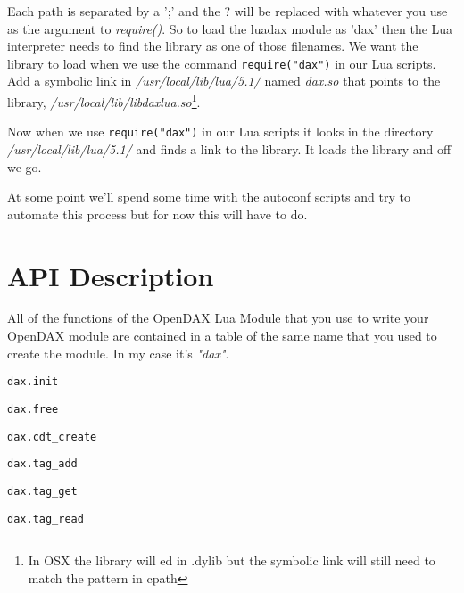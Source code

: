 Each path is separated by a ';' and the ? will be replaced with whatever you use as the argument to \textit{require()}.  So to load the luadax module as 'dax' then the Lua interpreter needs to find the library as one of those filenames.  We want the library to load when we use the command \verb|require("dax")| in our Lua scripts.  Add a symbolic link in \textit{/usr/local/lib/lua/5.1/} named \textit{dax.so} that points to the library, \textit{/usr/local/lib/libdaxlua.so}\footnote{In OSX the library will ed in .dylib but the symbolic link will still need to match the pattern in cpath}.

Now when we use \verb|require("dax")| in our Lua scripts it looks in the directory \textit{/usr/local/lib/lua/5.1/} and finds a link to the library.  It loads the library and off we go.

At some point we'll spend some time with the autoconf scripts and try to automate this process but for now this will have to do.

\section{API Description}

All of the functions of the OpenDAX Lua Module that you use to write your OpenDAX module are contained in a table of the same name that you used to create the module.  In my case it's \textit{"dax"}.

\begin{verbatim}
dax.init
\end{verbatim}

\begin{verbatim}
dax.free
\end{verbatim}

\begin{verbatim}
dax.cdt_create
\end{verbatim}

\begin{verbatim}
dax.tag_add
\end{verbatim}

\begin{verbatim}
dax.tag_get
\end{verbatim}

\begin{verbatim}
dax.tag_read
\end{verbatim}


